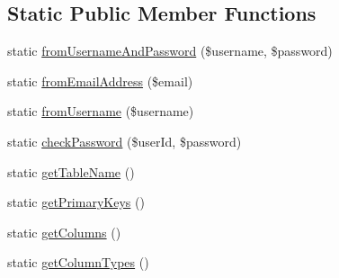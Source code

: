\subsection*{Static Public Member Functions}
\begin{DoxyCompactItemize}
\item 
static \hyperlink{classUser_a62cc6354245bb44c7f24cea5bf9cd2ec}{fromUsernameAndPassword} (\$username, \$password)
\item 
static \hyperlink{classUser_a62f4d6923d634fe4e8cfba77c83fa170}{fromEmailAddress} (\$email)
\item 
static \hyperlink{classUser_acf26289b127b63a907e1bc97411001ed}{fromUsername} (\$username)
\item 
static \hyperlink{classUser_a656643953ca080f90ba0918c4bd84228}{checkPassword} (\$userId, \$password)
\item 
static \hyperlink{classUser_a3641dffbe0835b6cc56e875b21cba4b1}{getTableName} ()
\item 
static \hyperlink{classUser_a14fab2319493a4940e1975b72386e80a}{getPrimaryKeys} ()
\item 
static \hyperlink{classUser_a3a4c51317d99ac96fb282cf2ca3c15c9}{getColumns} ()
\item 
static \hyperlink{classUser_a2b6212bf34a2be45394c9a0a1220855c}{getColumnTypes} ()
\end{DoxyCompactItemize}
